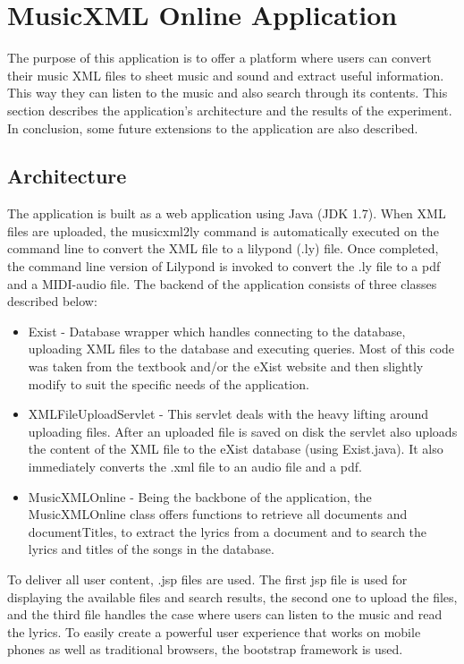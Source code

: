 \documentclass[MusicXML.tex]{subfiles}
\begin{document}
\section{MusicXML Online Application}

The purpose of this application is to offer a platform where users can convert their music XML files to sheet music and sound and extract useful information. This way they can listen to the music and also search through its contents. This section describes the application’s architecture and the results of the experiment. In conclusion, some future extensions to the application are also described.

\subsection{Architecture}
The application is built as a web application using Java (JDK 1.7). When XML files are uploaded, the musicxml2ly command is automatically executed on the command line to convert the XML file to a lilypond (.ly) file. Once completed, the command line version of Lilypond is invoked to convert the .ly file to a pdf and a MIDI-audio file. 
The backend of the application consists of three classes described below:

\begin{itemize}
\item Exist - Database wrapper which handles connecting to the database, uploading XML files to the database and executing queries. Most of this code was taken from the textbook and/or the eXist website and then slightly modify to suit the specific needs of the application.

\item XMLFileUploadServlet - This servlet deals with the heavy lifting around uploading files. After an uploaded file is saved on disk the servlet also uploads the content of the XML file to the eXist database (using Exist.java). It also immediately converts the .xml file to an audio file and a pdf.

\item MusicXMLOnline - Being the backbone of the application, the MusicXMLOnline class offers functions to retrieve all documents and documentTitles, to extract the lyrics from a document and to search the lyrics and titles of the songs in the database.
 
\end{itemize}

To deliver all user content, .jsp files are used. The first jsp file is used for displaying the available files and search results, the second one to upload the files, and the third file handles the case where users can listen to the music and read the lyrics. To easily create a powerful user experience that works on mobile phones as well as traditional browsers, the bootstrap framework is used.
\end{document}
